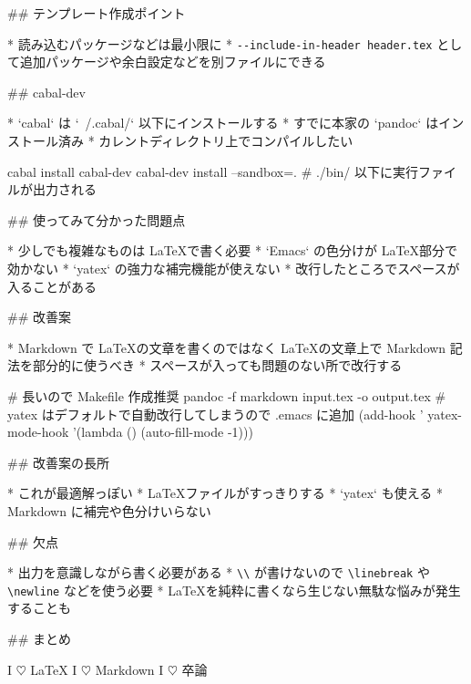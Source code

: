 ## テンプレート作成ポイント

* 読み込むパッケージなどは最小限に
* \verb+--include-in-header header.tex+ として追加パッケージや余白設定などを別ファイルにできる


## cabal-dev

* `cabal` は `~/.cabal/` 以下にインストールする
* すでに本家の `pandoc` はインストール済み
* カレントディレクトリ上でコンパイルしたい

\small

    cabal install cabal-dev
    cabal-dev install --sandbox=.
    # ./bin/ 以下に実行ファイルが出力される


## 使ってみて分かった問題点

* 少しでも複雑なものは \LaTeX で書く必要
* `Emacs` の色分けが \LaTeX 部分で効かない
* `yatex` の強力な補完機能が使えない
* 改行したところでスペースが入ることがある


## 改善案

* Markdown で \LaTeX の文章を書くのではなく \LaTeX の文章上で Markdown 記法を部分的に使うべき
* スペースが入っても問題のない所で改行する

\small

    # 長いので Makefile 作成推奨
    pandoc -f markdown input.tex -o output.tex
    # yatex はデフォルトで自動改行してしまうので .emacs に追加
    (add-hook ' yatex-mode-hook '(lambda ()
                               (auto-fill-mode -1)))


## 改善案の長所

* これが最適解っぽい
* \LaTeX ファイルがすっきりする
* `yatex` も使える
* Markdown に補完や色分けいらない

## 欠点

* 出力を意識しながら書く必要がある
* \verb+\\+ が書けないので \verb+\linebreak+ や \verb+\newline+ などを使う必要
* \LaTeX を純粋に書くなら生じない無駄な悩みが発生することも


## まとめ

\vspace{-25pt}
\begin{center}
 \Huge
 I $\heartsuit$ \LaTeX \linebreak
 I $\heartsuit$ Markdown \linebreak
 I $\heartsuit$ 卒論
\end{center}
